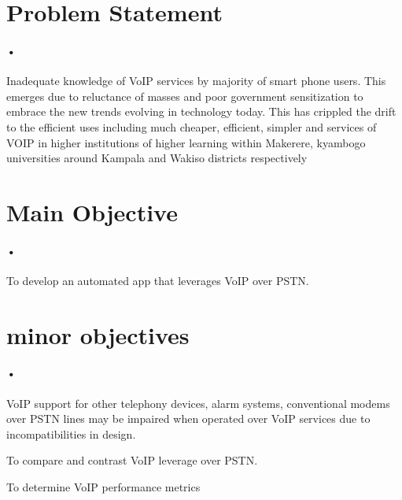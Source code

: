 \documentclass[12pt]{article}
\begin{document}
\section{Problem Statement}
\paragraph{•}
Inadequate knowledge of VoIP  services by majority of smart phone users. This emerges due to reluctance of masses and poor government sensitization to embrace the new trends evolving in technology today. This has crippled the drift to the efficient uses including much cheaper, efficient, simpler and services of VOIP in higher institutions of higher learning within Makerere, kyambogo universities around Kampala and Wakiso districts respectively 
  
\section{Main Objective}
\paragraph{•}
To develop an automated app that leverages VoIP over PSTN.
\section{minor objectives }
\paragraph{•}
VoIP support for other telephony devices, alarm systems, conventional modems over PSTN lines may be impaired when operated over VoIP services due to incompatibilities in design.

To compare and contrast VoIP leverage over PSTN.

To determine VoIP performance metrics
\end{document}
